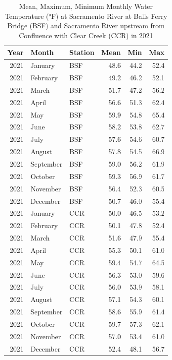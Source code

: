 \documentclass[
]{book}
\theoremstyle{definition}
\theoremstyle{definition}
\theoremstyle{definition}
\theoremstyle{definition}
\theoremstyle{remark}
\begin{document}
\begin{table}
\centering
\caption{Mean, Maximum, Minimum Monthly Water Temperature (°F) at Sacramento River at Balls Ferry Bridge (BSF) and Sacramento River upstream from Confluence with Clear Creek (CCR) in 2021}
\centering
\begin{tabular}[t]{rllrrr}
\hline
Year & Month & Station & Mean & Min & Max\\
\hline
2021 & January & BSF & 48.6 & 44.2 & 52.4\\
\hline
2021 & February & BSF & 49.2 & 46.2 & 52.1\\
\hline
2021 & March & BSF & 51.7 & 47.2 & 56.2\\
\hline
2021 & April & BSF & 56.6 & 51.3 & 62.4\\
\hline
2021 & May & BSF & 59.9 & 54.8 & 65.4\\
\hline
2021 & June & BSF & 58.2 & 53.8 & 62.7\\
\hline
2021 & July & BSF & 57.6 & 54.6 & 60.7\\
\hline
2021 & August & BSF & 57.8 & 54.5 & 66.9\\
\hline
2021 & September & BSF & 59.0 & 56.2 & 61.9\\
\hline
2021 & October & BSF & 59.3 & 56.9 & 61.7\\
\hline
2021 & November & BSF & 56.4 & 52.3 & 60.5\\
\hline
2021 & December & BSF & 50.7 & 46.0 & 55.4\\
\hline
2021 & January & CCR & 50.0 & 46.5 & 53.2\\
\hline
2021 & February & CCR & 50.1 & 47.8 & 52.4\\
\hline
2021 & March & CCR & 51.6 & 47.9 & 55.4\\
\hline
2021 & April & CCR & 55.3 & 50.1 & 61.0\\
\hline
2021 & May & CCR & 59.4 & 54.7 & 64.5\\
\hline
2021 & June & CCR & 56.3 & 53.0 & 59.6\\
\hline
2021 & July & CCR & 56.0 & 53.9 & 58.1\\
\hline
2021 & August & CCR & 57.1 & 54.3 & 60.1\\
\hline
2021 & September & CCR & 58.6 & 55.9 & 61.4\\
\hline
2021 & October & CCR & 59.7 & 57.3 & 62.1\\
\hline
2021 & November & CCR & 57.0 & 53.4 & 61.0\\
\hline
2021 & December & CCR & 52.4 & 48.1 & 56.7\\
\hline
\end{tabular}
\end{table}
\end{document}
